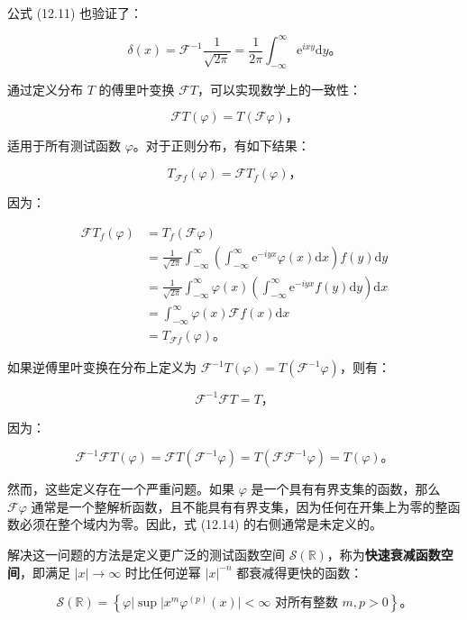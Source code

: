 公式 (12.11) 也验证了：

\[\delta(x) = \mathcal{F}^{- 1}\frac{1}{\sqrt{2\pi}} = \frac{1}{2\pi}\int_{- \infty}^{\infty}\mathrm{e}^{ixy}\mathrm{d}y。\]

通过定义分布 \(T\) 的傅里叶变换
\(\mathcal{F}T\)，可以实现数学上的一致性：

\[\mathcal{F}T(\varphi) = T\left( \mathcal{F}\varphi \right)，\]

适用于所有测试函数 \(\varphi\)。对于正则分布，有如下结果：

\[T_{\mathcal{F}f}(\varphi) = \mathcal{F}T_{f}(\varphi)，\]

因为：

\[\begin{aligned}
\mathcal{F}T_{f}(\varphi) & = T_{f}\left( \mathcal{F}\varphi \right) \\
 & = \frac{1}{\sqrt{2\pi}}\int_{- \infty}^{\infty}\left( \int_{- \infty}^{\infty}\mathrm{e}^{- iyx}\varphi(x)\mathrm{d}x \right)f(y)\mathrm{d}y \\
 & = \frac{1}{\sqrt{2\pi}}\int_{- \infty}^{\infty}\varphi(x)\left( \int_{- \infty}^{\infty}\mathrm{e}^{- iyx}f(y)\mathrm{d}y \right)\mathrm{d}x \\
 & = \int_{- \infty}^{\infty}\varphi(x)\mathcal{F}f(x)\mathrm{d}x \\
 & = T_{\mathcal{F}f}(\varphi)。
\end{aligned}\]

如果逆傅里叶变换在分布上定义为
\(\mathcal{F}^{- 1}T(\varphi) = T\left( \mathcal{F}^{- 1}\varphi \right)\)，则有：

\[\mathcal{F}^{- 1}\mathcal{F}T = T，\]

因为：

\[\mathcal{F}^{- 1}\mathcal{F}T(\varphi) = \mathcal{F}T\left( \mathcal{F}^{- 1}\varphi \right) = T\left( \mathcal{FF}^{- 1}\varphi \right) = T(\varphi)。\]

然而，这些定义存在一个严重问题。如果 \(\varphi\)
是一个具有有界支集的函数，那么 \(\mathcal{F}\varphi\)
通常是一个整解析函数，且不能具有有界支集，因为任何在开集上为零的整函数必须在整个域内为零。因此，式
(12.14) 的右侧通常是未定义的。

解决这一问题的方法是定义更广泛的测试函数空间
\(\mathcal{S}\left( \mathbb{R} \right)\)，称为\textbf{快速衰减函数空间}，即满足
\(|x| \rightarrow \infty\) 时比任何逆幂 \(|x|^{- n}\)
都衰减得更快的函数：

\[\mathcal{S}\left( \mathbb{R} \right) = \left\{ \varphi\left| \sup \right|x^{m}\varphi^{(p)}(x)| < \infty\mathrm{\text{ 对所有整数 }}m,p > 0 \right\} 。\]

